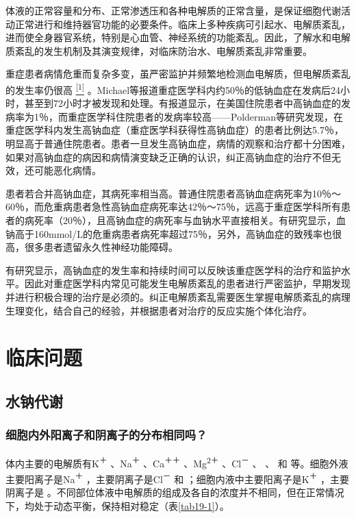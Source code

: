 体液的正常容量和分布、正常渗透压和各种电解质的正常含量，是保证细胞代谢活动正常进行和维持器官功能的必要条件。临床上多种疾病可引起水、电解质紊乱，进而使全身器官系统，特别是心血管、神经系统的功能紊乱。因此，了解水和电解质紊乱的发生机制及其演变规律，对临床防治水、电解质紊乱非常重要。

重症患者病情危重而复杂多变，虽严密监护并频繁地检测血电解质，但电解质紊乱的发生率仍很高
\protect\hyperlink{text00025.htmlux5cux23ch1-24}{\textsuperscript{{[}1{]}}}
。Michael等报道重症医学科内约50％的低钠血症在发病后24小时，甚至到72小时才被发现和处理。有报道显示，在美国住院患者中高钠血症的发病率为1％，而重症医学科住院患者的发病率较高------Polderman等研究发现，在重症医学科内发生高钠血症（重症医学科获得性高钠血症）的患者比例达5.7％，明显高于普通住院患者。患者一旦发生高钠血症，病情的观察和治疗都十分困难，如果对高钠血症的病因和病情演变缺乏正确的认识，纠正高钠血症的治疗不但无效，还可能恶化病情。

患者若合并高钠血症，其病死率相当高。普通住院患者高钠血症病死率为10％～60％，而危重病患者急性高钠血症病死率达42％～75％，远高于重症医学科所有患者的病死率（20％），且高钠血症的病死率与血钠水平直接相关。有研究显示，血钠高于160mmol/L的危重病患者病死率超过75％，另外，高钠血症的致残率也很高，很多患者遗留永久性神经功能障碍。

有研究显示，高钠血症的发生率和持续时间可以反映该重症医学科的治疗和监护水平。因此对重症医学科内常见可能发生电解质紊乱的患者进行严密监护，早期发现并进行积极合理的治疗是必须的。纠正电解质紊乱需要医生掌握电解质紊乱的病理生理变化，结合自己的经验，并根据患者对治疗的反应实施个体化治疗。

\section{临床问题}

\subsection{水钠代谢}

\subsubsection{细胞内外阳离子和阴离子的分布相同吗？}

体内主要的电解质有K\textsuperscript{＋} 、Na\textsuperscript{＋}
、Ca\textsuperscript{＋＋} 、Mg\textsuperscript{2＋}
、Cl\textsuperscript{－} 、
、
和
等。细胞外液主要阳离子是Na\textsuperscript{＋}
，主要阴离子是Cl\textsuperscript{－}
和
；细胞内液中主要阳离子是K\textsuperscript{＋}
，主要阴离子是
。不同部位体液中电解质的组成及各自的浓度并不相同，但在正常情况下，均处于动态平衡，保持相对稳定（表\ref{tab19-1}）。

